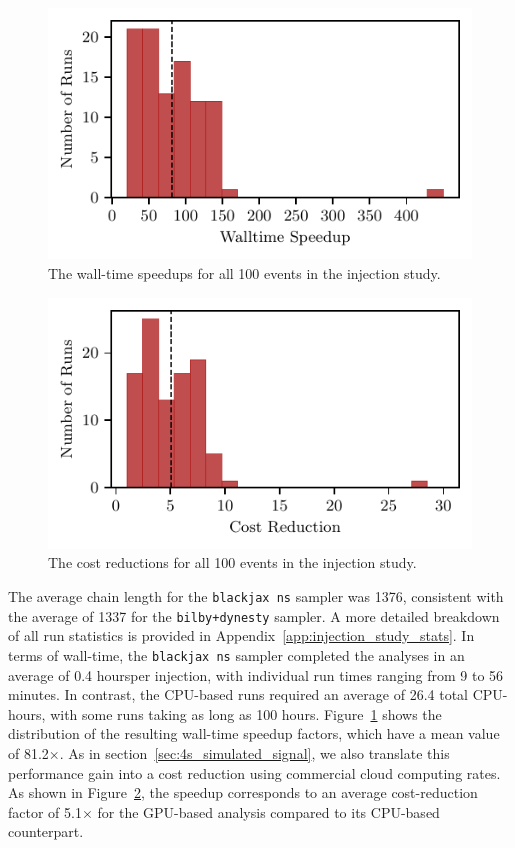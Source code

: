 \documentclass[fleqn,usenatbib]{mnras}
\begin{document}
\begin{figure}
    \centering
    \includegraphics{figures/walltime_speedup.pdf}
    \caption{The wall-time speedups for all 100 events in the injection study.}
    \label{fig:speedup_comparison}
\end{figure}

\begin{figure}
    \centering
    \includegraphics{figures/cost_reduction.pdf}
    \caption{The cost reductions for all 100 events in the injection study.}
    \label{fig:cost_reduction}
\end{figure}

The average chain length for the \texttt{blackjax ns}
sampler was 1376, consistent with the average of 1337 for the
\texttt{bilby+dynesty} sampler. A more detailed breakdown of all run
statistics is provided in Appendix~\ref{app:injection_study_stats}.
In terms of wall-time, the \texttt{blackjax ns} sampler completed the analyses
in an average of 0.4 hoursper injection, with individual run
times ranging from 9 to 56 minutes.
In contrast, the CPU-based runs
required an average of 26.4 total CPU-hours, with some runs taking as long as 
100 hours. 
Figure~\ref{fig:speedup_comparison} shows the distribution of the
resulting wall-time speedup factors, which have a mean value of
81.2$\times$. As in 
section~\ref{sec:4s_simulated_signal}, we also translate this performance 
gain into a cost reduction using commercial cloud computing rates.
As shown in Figure~\ref{fig:cost_reduction}, the speedup
corresponds to an average cost-reduction factor of 5.1$\times$ for the
GPU-based analysis compared to its CPU-based counterpart.
\end{document}
